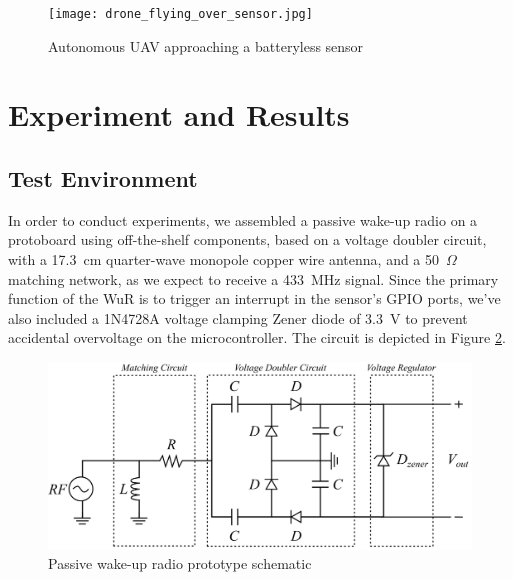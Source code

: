\documentclass[conference]{IEEEtran}
\begin{document}



\begin{figure}[htbp]
  \centerline{\texttt{[image: drone\_flying\_over\_sensor.jpg]}}
  \caption{Autonomous UAV approaching a batteryless sensor}
  \label{fig:drone_over_sensor}
\end{figure}

\section{Experiment and Results}

\subsection{Test Environment}

In order to conduct experiments, we assembled a passive wake-up radio on a protoboard using off-the-shelf components, based on a voltage doubler circuit, with a 17.3~cm quarter-wave monopole copper wire antenna, and a 50~$\Omega$ matching network, as we expect to receive a 433~MHz signal. Since the primary function of the WuR is to trigger an interrupt in the sensor's GPIO ports, we've also included a 1N4728A voltage clamping Zener diode of 3.3~V to prevent accidental overvoltage on the microcontroller. The circuit is depicted in Figure \ref{fig:receiver}.

\begin{figure}[htbp]
  \centerline{\includegraphics[width=1\linewidth]{receiver.png}}
  \caption{Passive wake-up radio prototype schematic}
  \label{fig:receiver}
\end{figure}
\end{document}
